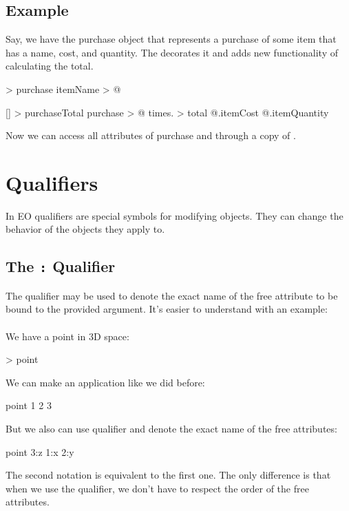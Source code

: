 \documentclass[12pt]{book}
\begin{document}
\subsection{Example}
Say, we have the purchase object that represents a purchase of some item that has a name, cost, and quantity. The  decorates it and adds new functionality of calculating the total.

\begin{ffcode}
 > purchase
  itemName > @

[] > purchaseTotal
  purchase > @
  times. > total
    @.itemCost
    @.itemQuantity
\end{ffcode}

Now we can access all attributes of purchase and  through a copy of .

\section{Qualifiers}
In EO qualifiers are special symbols for modifying objects. They can change the behavior of the objects they apply to.

\subsection{The \texttt{:} Qualifier} \label{subsec:":"-qualifier}
The \ff{:} qualifier may be used to denote the exact name of the free attribute to be bound to the provided argument. It's easier to understand with an example:
\\
\\
We have a point in 3D space:
\begin{ffcode}
[x y z] > point
\end{ffcode}
We can make an application like we did before:
\begin{ffcode}
point
  1
  2
  3
\end{ffcode}
But we also can use \ff{:} qualifier and denote the exact name of the free attributes:
\begin{ffcode}
point
  3:z
  1:x
  2:y
\end{ffcode}
The second notation is equivalent to the first one. The only difference is that when we use the \ff{:} qualifier, we don't have to respect the order of the free attributes.
\end{document}
